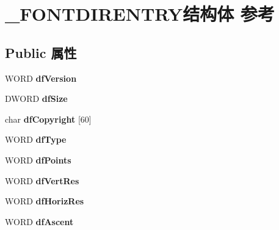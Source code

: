 \hypertarget{struct___f_o_n_t_d_i_r_e_n_t_r_y}{}\section{\+\_\+\+F\+O\+N\+T\+D\+I\+R\+E\+N\+T\+R\+Y结构体 参考}
\label{struct___f_o_n_t_d_i_r_e_n_t_r_y}
\subsection*{Public 属性}
\begin{DoxyCompactItemize}
\item 
\mbox{\label{struct___f_o_n_t_d_i_r_e_n_t_r_y_af41dab2734100ad36fc7f1c87f16c981}} 
W\+O\+RD {\bfseries df\+Version}
\item 
\mbox{\label{struct___f_o_n_t_d_i_r_e_n_t_r_y_a28aef4a85716902858a9978d5831dc67}} 
D\+W\+O\+RD {\bfseries df\+Size}
\item 
\mbox{\label{struct___f_o_n_t_d_i_r_e_n_t_r_y_ac26755763f37f4e9f21c416d6ac1c5a8}} 
char {\bfseries df\+Copyright} \mbox{[}60\mbox{]}
\item 
\mbox{\label{struct___f_o_n_t_d_i_r_e_n_t_r_y_af84970937406cdfc5807f90b73912387}} 
W\+O\+RD {\bfseries df\+Type}
\item 
\mbox{\label{struct___f_o_n_t_d_i_r_e_n_t_r_y_a9446bc174f0a4bb3cc5724a6af6ec21b}} 
W\+O\+RD {\bfseries df\+Points}
\item 
\mbox{\label{struct___f_o_n_t_d_i_r_e_n_t_r_y_afc8096b28851e08b1b3ff68a1fe6514d}} 
W\+O\+RD {\bfseries df\+Vert\+Res}
\item 
\mbox{\label{struct___f_o_n_t_d_i_r_e_n_t_r_y_ad7ea3e9fbad8a9f0e862e9bf25d5d005}} 
W\+O\+RD {\bfseries df\+Horiz\+Res}
\item 
\mbox{\label{struct___f_o_n_t_d_i_r_e_n_t_r_y_a9c43b34f4545fab00e313a2f4125b5b7}} 
W\+O\+RD {\bfseries df\+Ascent}

\end{DoxyCompactItemize}
